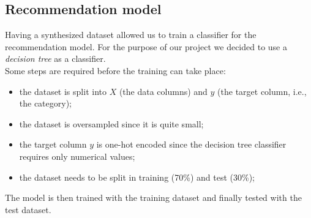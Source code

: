 \documentclass[../../main]{subfiles}
\begin{document}
\subsection{Recommendation model}
\label{ss:recommendation-model}

Having a synthesized dataset allowed us to train a classifier for the recommendation model.
For the purpose of our project we decided to use a \textit{decision tree} as a classifier.\\
Some steps are required before the training can take place:
\begin{itemize}
    \item the dataset is split into $X$ (the data columns) and $y$ (the target column, i.e., the category);
    \item the dataset is oversampled since it is quite small;
    \item the target column $y$ is one-hot encoded since the decision tree classifier requires only numerical values;
    \item the dataset needs to be split in training (70\%) and test (30\%);
\end{itemize}
The model is then trained with the training dataset and finally tested with the test dataset.
\end{document}
